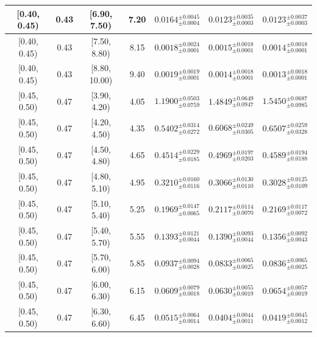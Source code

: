\begin{longtable}{|c|c|c|c|c|c|c|}
\hline
[0.40, 0.45) & 0.43 & [6.90, 7.50) & 7.20 & $0.0164^{ \pm 0.0045 }_{ \pm 0.0004 }$ & $0.0123^{ \pm 0.0035 }_{ \pm 0.0003 }$ & $0.0123^{ \pm 0.0037 }_{ \pm 0.0003 }$ \\ 
\hline
[0.40, 0.45) & 0.43 & [7.50, 8.80) & 8.15 & $0.0018^{ \pm 0.0024 }_{ \pm 0.0001 }$ & $0.0015^{ \pm 0.0018 }_{ \pm 0.0001 }$ & $0.0014^{ \pm 0.0018 }_{ \pm 0.0001 }$ \\ 
\hline
[0.40, 0.45) & 0.43 & [8.80, 10.00) & 9.40 & $0.0019^{ \pm 0.0019 }_{ \pm 0.0001 }$ & $0.0014^{ \pm 0.0018 }_{ \pm 0.0001 }$ & $0.0013^{ \pm 0.0018 }_{ \pm 0.0001 }$ \\ 
\hline
[0.45, 0.50) & 0.47 & [3.90, 4.20) & 4.05 & $1.1900^{ \pm 0.0503 }_{ \pm 0.0759 }$ & $1.4849^{ \pm 0.0649 }_{ \pm 0.0947 }$ & $1.5450^{ \pm 0.0687 }_{ \pm 0.0985 }$ \\ 
\hline
[0.45, 0.50) & 0.47 & [4.20, 4.50) & 4.35 & $0.5402^{ \pm 0.0314 }_{ \pm 0.0272 }$ & $0.6068^{ \pm 0.0249 }_{ \pm 0.0305 }$ & $0.6507^{ \pm 0.0259 }_{ \pm 0.0328 }$ \\ 
\hline
[0.45, 0.50) & 0.47 & [4.50, 4.80) & 4.65 & $0.4514^{ \pm 0.0229 }_{ \pm 0.0185 }$ & $0.4969^{ \pm 0.0197 }_{ \pm 0.0203 }$ & $0.4589^{ \pm 0.0194 }_{ \pm 0.0188 }$ \\ 
\hline
[0.45, 0.50) & 0.47 & [4.80, 5.10) & 4.95 & $0.3210^{ \pm 0.0160 }_{ \pm 0.0116 }$ & $0.3066^{ \pm 0.0130 }_{ \pm 0.0110 }$ & $0.3028^{ \pm 0.0125 }_{ \pm 0.0109 }$ \\ 
\hline
[0.45, 0.50) & 0.47 & [5.10, 5.40) & 5.25 & $0.1969^{ \pm 0.0147 }_{ \pm 0.0065 }$ & $0.2117^{ \pm 0.0114 }_{ \pm 0.0070 }$ & $0.2169^{ \pm 0.0117 }_{ \pm 0.0072 }$ \\ 
\hline
[0.45, 0.50) & 0.47 & [5.40, 5.70) & 5.55 & $0.1393^{ \pm 0.0121 }_{ \pm 0.0044 }$ & $0.1390^{ \pm 0.0093 }_{ \pm 0.0044 }$ & $0.1356^{ \pm 0.0092 }_{ \pm 0.0043 }$ \\ 
\hline
[0.45, 0.50) & 0.47 & [5.70, 6.00) & 5.85 & $0.0937^{ \pm 0.0094 }_{ \pm 0.0028 }$ & $0.0833^{ \pm 0.0065 }_{ \pm 0.0025 }$ & $0.0836^{ \pm 0.0065 }_{ \pm 0.0025 }$ \\ 
\hline
[0.45, 0.50) & 0.47 & [6.00, 6.30) & 6.15 & $0.0609^{ \pm 0.0079 }_{ \pm 0.0018 }$ & $0.0630^{ \pm 0.0055 }_{ \pm 0.0019 }$ & $0.0654^{ \pm 0.0057 }_{ \pm 0.0019 }$ \\ 
\hline
[0.45, 0.50) & 0.47 & [6.30, 6.60) & 6.45 & $0.0515^{ \pm 0.0064 }_{ \pm 0.0014 }$ & $0.0404^{ \pm 0.0044 }_{ \pm 0.0011 }$ & $0.0419^{ \pm 0.0045 }_{ \pm 0.0012 }$ \\ 
\hline

\end{longtable}
